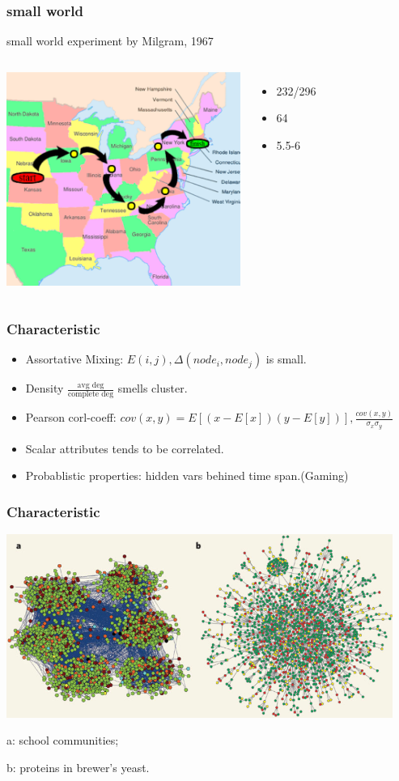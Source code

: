 \documentclass[professionalfonts]{beamer}
\begin{document}
\begin{frame}
\frametitle{small world}
small world experiment by Milgram, 1967
\begin{columns}[c]
\includegraphics[height=7cm]{smallworld}

\begin{itemize}
\item 232/296
\item 64
\item 5.5-6
\end{itemize}
\end{columns}
\end{frame}

\begin{frame}
\frametitle{Characteristic}
\begin{itemize}
\item Assortative Mixing: 
$E(i,j), \Delta(node_i,node_j)$ is small.
\item Density $\frac{\text{avg deg}}{\text{complete deg}}$ smells cluster.
\item Pearson corl-coeff:
$cov(x,y)=E[(x-E[x])(y-E[y])], \frac{cov(x,y)}{\sigma_x \sigma_y}$
\item Scalar attributes tends to be correlated.
\item Probablistic properties: 
hidden vars behined time span.(Gaming)
\end{itemize}
\end{frame}

\begin{frame}
\frametitle{Characteristic}
\includegraphics[height=6cm]{assort_disassort}

a: school communities; 

b: proteins in brewer's yeast.
\end{frame}
\end{document}
